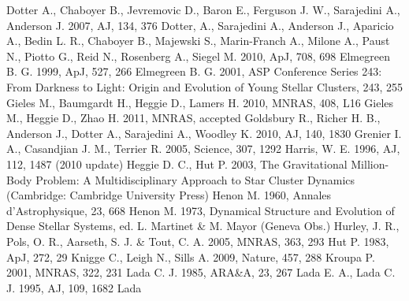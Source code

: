 \begin{thebibliography}{99}
  Dotter A., Chaboyer B., Jevremovic D., Baron E., Ferguson J. W.,
  Sarajedini A., Anderson J. 2007, AJ, 134, 376
  Dotter, A., Sarajedini A., Anderson J., Aparicio A., Bedin L. R.,
  Chaboyer B., Majewski S., Marin-Franch A., Milone A., Paust N.,
  Piotto G., Reid  N., Rosenberg A., Siegel M. 2010, ApJ, 708, 698
  Elmegreen B. G. 1999, ApJ, 527, 266
  Elmegreen B. G. 2001, ASP Conference Series 243: From Darkness to Light:
  Origin and Evolution of Young Stellar Clusters, 243, 255
  Gieles M., Baumgardt H., Heggie D., Lamers H. 2010, MNRAS, 408, L16
 Gieles M., Heggie D., Zhao H. 2011, MNRAS,
  accepted 
  Goldsbury R., Richer H. B., Anderson J., Dotter A., Sarajedini A.,
  Woodley K. 2010, AJ, 140, 1830
 Grenier I. A., Casandjian J. M.,
  Terrier R. 2005, Science, 307, 1292
  Harris, W. E. 1996, AJ, 112, 1487 (2010 update)
  Heggie D. C., Hut P. 2003, The Gravitational Million-Body Problem:
  A Multidisciplinary Approach to Star Cluster Dynamics (Cambridge:
  Cambridge University Press)
 Henon M. 1960,
  Annales d'Astrophysique, 23, 668
 Henon
  M. 1973, Dynamical Structure and Evolution of Dense Stellar Systems,
  ed. L. Martinet \& M. Mayor (Geneva Obs.)
  Hurley, J. R., Pols, O. R., Aarseth, S. J. \& Tout, C. A. 2005,
  MNRAS, 363, 293
 Hut P. 1983, ApJ,
  272, 29
 Knigge C., Leigh
  N., Sills A. 2009, Nature, 457, 288
 Kroupa
  P. 2001, MNRAS, 322, 231
 Lada C. J. 1985,
  ARA\&A, 23, 267
 Lada
  E. A., Lada C. J. 1995, AJ, 109, 1682
 Lada

\end{thebibliography}
